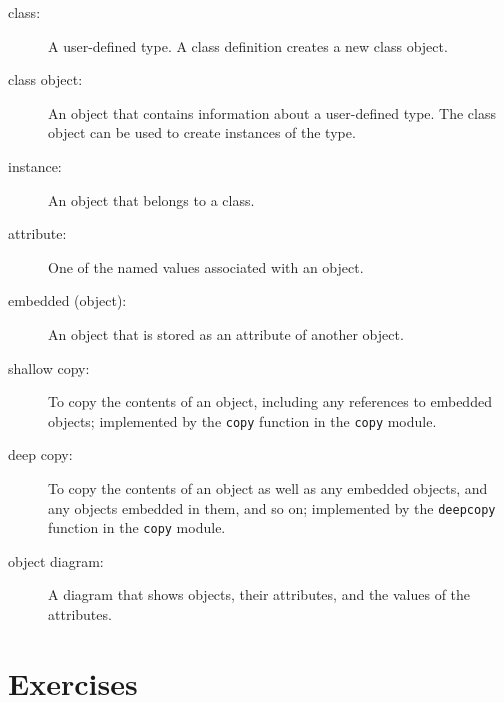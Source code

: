 \documentclass[10pt]{book}
\begin{document}
\begin{description}

\item[class:] A user-defined type.  A class definition creates a new
class object.

\item[class object:] An object that contains information about a
user-defined type.  The class object can be used to create instances
of the type.

\item[instance:] An object that belongs to a class.

\item[attribute:] One of the named values associated with an object.

\item[embedded (object):] An object that is stored as an attribute
of another object.

\item[shallow copy:] To copy the contents of an object, including
any references to embedded objects;
implemented by the {\tt copy} function in the {\tt copy} module.

\item[deep copy:] To copy the contents of an object as well as any
embedded objects, and any objects embedded in them, and so on;
implemented by the {\tt deepcopy} function in the {\tt copy} module.

\item[object diagram:] A diagram that shows objects, their
attributes, and the values of the attributes.

\end{description}


\section{Exercises}
\end{document}
